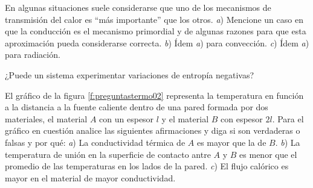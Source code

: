 %
\begin{Exercise}
  En algunas situaciones suele considerarse que uno de los mecanismos de transmisión del calor es ``más importante'' que los otros. \textit{a}) Mencione un caso en que la conducción es el mecanismo primordial y de algunas razones para que esta aproximación pueda considerarse correcta. \textit{b}) Ídem \textit{a}) para convección. \textit{c}) Ídem \textit{a}) para radiación.
\end{Exercise}
%
\begin{Exercise}
  ¿Puede un sistema experimentar variaciones de entropía negativas?
\end{Exercise}
%
\begin{Exercise}\label{p:preguntastermo02}
  {}{}
  El gráfico de la figura \ref{f:preguntastermo02} representa la temperatura en función a la distancia a la fuente caliente dentro de una pared formada por dos materiales, el material $A$ con un espesor $l$ y el material $B$ con espesor $2l$. Para el gráfico en cuestión analice las siguientes afirmaciones y diga si son verdaderas o falsas y por qué: \textit{a}) La conductividad térmica de $A$ es mayor que la de $B$. \textit{b}) La temperatura de unión en la superficie de contacto antre $A$ y $B$ es menor que el promedio de las temperaturas en los lados de la pared. \textit{c}) El flujo calórico es mayor en el material de mayor conductividad.
\end{Exercise}
%
